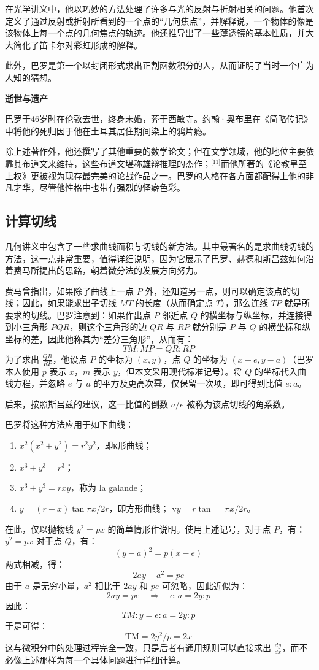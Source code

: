 在光学讲义中，他以巧妙的方法处理了许多与光的反射与折射相关的问题。他首次定义了通过反射或折射所看到的一个点的“几何焦点”，并解释说，一个物体的像是该物体上每一个点的几何焦点的轨迹。他还推导出了一些薄透镜的基本性质，并大大简化了笛卡尔对彩虹形成的解释。

此外，巴罗是第一个以封闭形式求出正割函数积分的人，从而证明了当时一个广为人知的猜想。

\textbf{逝世与遗产}

巴罗于46岁时在伦敦去世，终身未婚，葬于西敏寺。约翰·奥布里在《简略传记》中将他的死归因于他在土耳其居住期间染上的鸦片瘾。

除上述著作外，他还撰写了其他重要的数学论文；但在文学领域，他的地位主要依靠其布道文来维持，这些布道文堪称雄辩推理的杰作；\(^\text{[11]}\)而他所著的《论教皇至上权》更被视为现存最完美的论战作品之一。巴罗的人格在各方面都配得上他的非凡才华，尽管他性格中也带有强烈的怪癖色彩。
\subsection{计算切线}
几何讲义中包含了一些求曲线面积与切线的新方法。其中最著名的是求曲线切线的方法，这一点非常重要，值得详细说明，因为它展示了巴罗、赫德和斯吕兹如何沿着费马所提出的思路，朝着微分法的发展方向努力。

费马曾指出，如果除了曲线上一点 $P$ 外，还知道另一点，则可以确定该点的切线；因此，如果能求出子切线 $MT$ 的长度（从而确定点 $T$），那么连线 $TP$ 就是所要求的切线。巴罗注意到：如果作出点 $P$ 邻近点 $Q$ 的横坐标与纵坐标，并连接得到小三角形 $PQR$，则这个三角形的边 $QR$ 与 $RP$ 就分别是 $P$ 与 $Q$ 的横坐标和纵坐标的差，因此他称其为“差分三角形”，从而有：
$$
TM : MP=QR : RP~
$$
为了求出 $\frac{QR}{RP}$，他设点 $P$ 的坐标为 $(x, y)$，点 $Q$ 的坐标为 $(x - e, y - a)$（巴罗本人使用 $p$ 表示 $x$，$m$ 表示 $y$，但本文采用现代标准记号）。将 $Q$ 的坐标代入曲线方程，并忽略 $e$ 与 $a$ 的平方及更高次幂，仅保留一次项，即可得到比值 $e : a$。

后来，按照斯吕兹的建议，这一比值的倒数 $a/e$ 被称为该点切线的角系数。

巴罗将这种方法应用于如下曲线：

\begin{enumerate}
\item $x^2(x^2 + y^2) = r^2 y^2$，即κ形曲线；
\item $x^3 + y^3 = r^3$；
\item $x^3 + y^3 = rxy$，称为 la galande；
\item $y = (r - x) \tan \pi x/2r$，即方形曲线；
v$y = r \tan =\pi x/2r$。
\end{enumerate}
在此，仅以抛物线 $y^2 = px$ 的简单情形作说明。使用上述记号，对于点 $P$，有：$y^2 = px$
对于点 $Q$，有：
$$
(y - a)^2 = p(x - e)~
$$
两式相减，得：
$$
2ay - a^2 = pe~
$$
由于 $a$ 是无穷小量，$a^2$ 相比于 $2ay$ 和 $pe$ 可忽略，因此近似为：
$$
2ay = pe \quad \Rightarrow \quad e : a = 2y : p~
$$
因此：
$$
TM : y= e : a= 2y : p~
$$
于是可得：
$$
\mathrm{TM} = 2y^2/p = 2x~
$$
这与微积分中的处理过程完全一致，只是后者有通用规则可以直接求出 $\frac{dy}{dx}$，而不必像上述那样为每一个具体问题进行详细计算。
